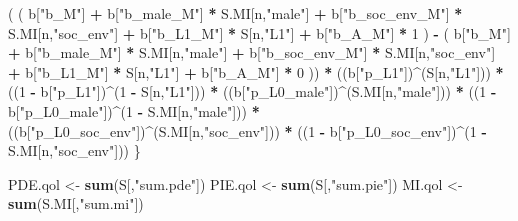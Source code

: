 \documentclass[
]{book}
\newenvironment{Shaded}{\begin{snugshade}}{\end{snugshade}}
\newcommand{\DecValTok}[1]{\textcolor[rgb]{0.00,0.00,0.81}{#1}}
\newcommand{\FunctionTok}[1]{\textcolor[rgb]{0.13,0.29,0.53}{\textbf{#1}}}
\newcommand{\NormalTok}[1]{#1}
\newcommand{\OtherTok}[1]{\textcolor[rgb]{0.56,0.35,0.01}{#1}}
\newcommand{\SpecialCharTok}[1]{\textcolor[rgb]{0.81,0.36,0.00}{\textbf{#1}}}
\newcommand{\StringTok}[1]{\textcolor[rgb]{0.31,0.60,0.02}{#1}}
\begin{document}
\begin{Shaded}
\begin{Highlighting}[]
\NormalTok{      ( ( b[}\StringTok{"b\_M"}\NormalTok{] }\SpecialCharTok{+} 
\NormalTok{            b[}\StringTok{"b\_male\_M"}\NormalTok{] }\SpecialCharTok{*}\NormalTok{ S.MI[n,}\StringTok{"male"}\NormalTok{] }\SpecialCharTok{+} 
\NormalTok{            b[}\StringTok{"b\_soc\_env\_M"}\NormalTok{] }\SpecialCharTok{*}\NormalTok{ S.MI[n,}\StringTok{"soc\_env"}\NormalTok{] }\SpecialCharTok{+} 
\NormalTok{            b[}\StringTok{"b\_L1\_M"}\NormalTok{] }\SpecialCharTok{*}\NormalTok{ S[n,}\StringTok{"L1"}\NormalTok{] }\SpecialCharTok{+}
\NormalTok{            b[}\StringTok{"b\_A\_M"}\NormalTok{] }\SpecialCharTok{*} \DecValTok{1}\NormalTok{ ) }\SpecialCharTok{{-}} 
\NormalTok{          ( b[}\StringTok{"b\_M"}\NormalTok{] }\SpecialCharTok{+} 
\NormalTok{              b[}\StringTok{"b\_male\_M"}\NormalTok{] }\SpecialCharTok{*}\NormalTok{ S.MI[n,}\StringTok{"male"}\NormalTok{] }\SpecialCharTok{+} 
\NormalTok{              b[}\StringTok{"b\_soc\_env\_M"}\NormalTok{] }\SpecialCharTok{*}\NormalTok{ S.MI[n,}\StringTok{"soc\_env"}\NormalTok{] }\SpecialCharTok{+} 
\NormalTok{              b[}\StringTok{"b\_L1\_M"}\NormalTok{] }\SpecialCharTok{*}\NormalTok{ S[n,}\StringTok{"L1"}\NormalTok{] }\SpecialCharTok{+}
\NormalTok{              b[}\StringTok{"b\_A\_M"}\NormalTok{] }\SpecialCharTok{*} \DecValTok{0}\NormalTok{ )) }\SpecialCharTok{*} 
\NormalTok{      ((b[}\StringTok{"p\_L1"}\NormalTok{])}\SpecialCharTok{\^{}}\NormalTok{(S[n,}\StringTok{"L1"}\NormalTok{])) }\SpecialCharTok{*}
\NormalTok{      ((}\DecValTok{1} \SpecialCharTok{{-}}\NormalTok{ b[}\StringTok{"p\_L1"}\NormalTok{])}\SpecialCharTok{\^{}}\NormalTok{(}\DecValTok{1} \SpecialCharTok{{-}}\NormalTok{ S[n,}\StringTok{"L1"}\NormalTok{])) }\SpecialCharTok{*}
\NormalTok{      ((b[}\StringTok{"p\_L0\_male"}\NormalTok{])}\SpecialCharTok{\^{}}\NormalTok{(S.MI[n,}\StringTok{"male"}\NormalTok{])) }\SpecialCharTok{*} 
\NormalTok{      ((}\DecValTok{1} \SpecialCharTok{{-}}\NormalTok{ b[}\StringTok{"p\_L0\_male"}\NormalTok{])}\SpecialCharTok{\^{}}\NormalTok{(}\DecValTok{1} \SpecialCharTok{{-}}\NormalTok{ S.MI[n,}\StringTok{"male"}\NormalTok{])) }\SpecialCharTok{*} 
\NormalTok{      ((b[}\StringTok{"p\_L0\_soc\_env"}\NormalTok{])}\SpecialCharTok{\^{}}\NormalTok{(S.MI[n,}\StringTok{"soc\_env"}\NormalTok{])) }\SpecialCharTok{*}
\NormalTok{      ((}\DecValTok{1} \SpecialCharTok{{-}}\NormalTok{ b[}\StringTok{"p\_L0\_soc\_env"}\NormalTok{])}\SpecialCharTok{\^{}}\NormalTok{(}\DecValTok{1} \SpecialCharTok{{-}}\NormalTok{ S.MI[n,}\StringTok{"soc\_env"}\NormalTok{])) }
\NormalTok{    \}}
  
\NormalTok{  PDE.qol }\OtherTok{\textless{}{-}} \FunctionTok{sum}\NormalTok{(S[,}\StringTok{"sum.pde"}\NormalTok{])}
\NormalTok{  PIE.qol }\OtherTok{\textless{}{-}} \FunctionTok{sum}\NormalTok{(S[,}\StringTok{"sum.pie"}\NormalTok{])}
\NormalTok{  MI.qol }\OtherTok{\textless{}{-}} \FunctionTok{sum}\NormalTok{(S.MI[,}\StringTok{"sum.mi"}\NormalTok{])}
  

\end{Highlighting}
\end{Shaded}
\end{document}
